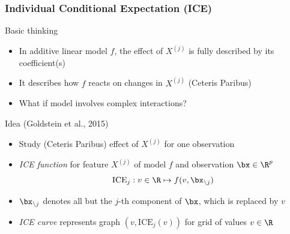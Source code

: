 \begin{frame}
	\frametitle{Individual Conditional Expectation (ICE)}
	\begin{block}{Basic thinking}
		\begin{itemize}
			\item In \alert{additive} linear model $f$, the effect of $X^{(j)}$ is fully described by its coefficient(s)
			\item It describes how $f$ reacts on changes in $X^{(j)}$ (Ceteris Paribus)
			\item What if model involves complex interactions?
		\end{itemize}
	\end{block}
	
	\begin{block}{Idea (Goldstein et al., 2015)}
		\begin{itemize}
			\item Study (Ceteris Paribus) effect of $X^{(j)}$ for \alert{one} observation
			\item {\em ICE function} for feature $X^{(j)}$ of model $f$ and observation $\bx \in \R^p$
			$$
			\text{ICE}_j: v \in {\R} \mapsto f(v, \bx_{\setminus j})
			$$
			\item $\bx_{\setminus j}$ denotes all but the $j$-th component of $\bx$, which is replaced by $v$
			\item {\em ICE curve} represents graph $(v, \text{ICE}_j(v))$ for grid of values $v \in \R$
		\end{itemize}
	\end{block}
\end{frame}

